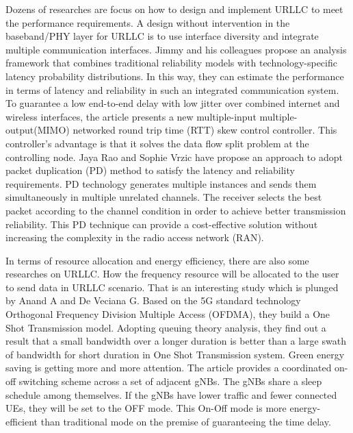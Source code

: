 \documentclass[runningheads]{llncs}
\begin{document}
Dozens of researches are focus on how to design and implement URLLC to meet the performance requirements.
A design without intervention in the baseband/PHY layer for URLLC is to use interface diversity and integrate multiple communication interfaces.
Jimmy and his colleagues propose an analysis framework that combines traditional reliability models with technology-specific latency probability distributions\cite{article_interface}.
In this way, they can estimate the performance in terms of latency and reliability in such an integrated communication system.
To guarantee a low end-to-end delay with low jitter over combined internet and wireless interfaces, the article \cite{article_multiconnectivity} presents a new multiple-input multiple-output(MIMO) networked round trip time (RTT) skew control controller.
This controller's advantage is that it solves the data flow split problem at the controlling node.
Jaya Rao and Sophie Vrzic have propose an approach to adopt packet duplication (PD) method to satisfy the latency and reliability requirements\cite{article_PD}.
PD technology generates multiple instances and sends them simultaneously in multiple unrelated channels.
The receiver selects the best packet according to the channel condition in order to achieve better transmission reliability.
This PD technique can provide a cost-effective solution without increasing the complexity in the radio access network (RAN).

In terms of resource allocation and energy efficiency, there are also some researches on URLLC.
How the frequency resource will be allocated to the user to send data in URLLC scenario.
That is an interesting study which is plunged by Anand A and De Veciana G\cite{article_Anand}.
Based on the 5G standard technology Orthogonal Frequency Division Multiple Access (OFDMA), they build a One Shot Transmission model.
Adopting queuing theory analysis, they find out a result that a small bandwidth over a longer duration is better than a large swath of bandwidth for short duration in One Shot Transmission system.
Green energy saving is getting more and more attention.
The article \cite{article_Energy} provides a coordinated on-off switching scheme across a set of adjacent gNBs.
The gNBs share a sleep schedule among themselves.
If the gNBs have lower traffic and fewer connected UEs, they will be set to the OFF mode.
This On-Off mode is more energy-efficient than traditional mode on the premise of guaranteeing the time delay.
\end{document}
